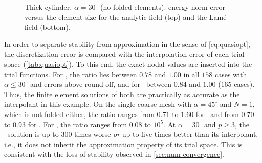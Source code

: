 \begin{figure}[htbp]
  \centering
  
  \caption{Thick cylinder, $\alpha=30^\circ$ (no folded elements): energy-norm error versus the element size for the analytic field (top) and the Lam\'e field (bottom).}
  \label{fig:cyl-h}
\end{figure}

\begin{table}[htbp]
  \centering\small
  \caption{Thick cylinder: observed rates of $\eE$ between $N=4$ and $N=8$ (optimal: $p$); --: error at round-off level.}
  \label{tab:cylrates}
  
\end{table}

\begin{table}[htbp]
  \centering\small
  \caption{Thick cylinder (Lam\'e solution), $N=8$: error $e$ (energy norm $\eE$ for $\alpha\le30^\circ$, largest relative nodal error $e_{\mathrm{n}}$ for the folded meshes $\alpha\ge45^\circ$, marked $^\ast$), observed rate $r=\log_2(e^{N=4}/e^{N=8})$ and largest element Lebesgue constant $\Lam$ of the metric interpolation. --: element rejected. On the folded meshes, the values of \PP\ and \PH\ depend on the quadrature rule (reference rule, \cref{sec:num-quadrature}).}
  \label{tab:cylinder}
  
\end{table}

In order to separate stability from approximation in the sense of \cref{eq:quasiopt}, the discretization error is compared with the interpolation error of each trial space (\cref{tab:quasiopt}). To this end, the exact nodal values are inserted into the trial functions. For \PH, the ratio lies between $0.78$ and $1.00$ in all $158$ cases with $\alpha\le30^\circ$ and errors above round-off, and for \PP\ between $0.84$ and $1.00$ ($165$ cases). Thus, the finite element solutions of both are practically as accurate as the interpolant in this example. On the single coarse mesh with $\alpha=45^\circ$ and $N=1$, which is not folded either, the ratio ranges from $0.71$ to $1.60$ for \PH\ and from $0.70$ to $0.93$ for \PP. For \PM, the ratio ranges from $0.08$ to $10^5$. At $\alpha=30^\circ$ and $p\ge3$, the \PM\ solution is up to $300$ times worse \emph{or} up to five times better than its interpolant, i.e., it does not inherit the approximation property of its trial space. This is consistent with the loss of stability observed in \cref{sec:num-convergence}.

